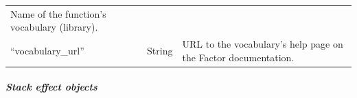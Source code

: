 \documentclass[
]{article}
\begin{document}
\begin{longtable}[]{@{}lll@{}}
\begin{minipage}[t]{0.64\columnwidth}
Name of the function's vocabulary (library).\strut
\end{minipage}\tabularnewline
\begin{minipage}[t]{0.13\columnwidth}\raggedright
``vocabulary\_url''\strut
\end{minipage} & \begin{minipage}[t]{0.14\columnwidth}\raggedright
String\strut
\end{minipage} & \begin{minipage}[t]{0.64\columnwidth}\raggedright
URL to the vocabulary's help page on the Factor documentation.\strut
\end{minipage}\tabularnewline
\bottomrule
\end{longtable}

\hypertarget{stack-effect-objects}{%
\subparagraph{Stack effect objects}\label{stack-effect-objects}}
\end{document}
